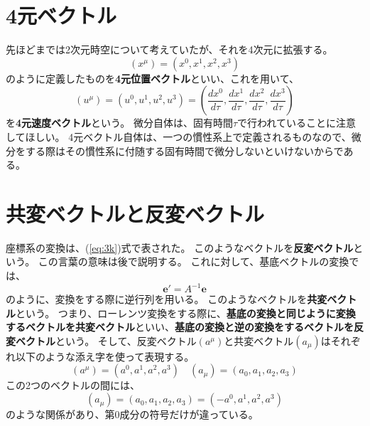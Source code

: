 \documentclass[a4paper]{jsreport}
\begin{document}
        \section{4元ベクトル}
            先ほどまでは2次元時空について考えていたが、それを4次元に拡張する。
            \begin{equation}
                (x^\mu) = (x^0, x^1, x^2, x^3)
            \end{equation}
            のように定義したものを\textbf{4元位置ベクトル}といい、これを用いて、
            \begin{equation}
                (u^\mu) = (u^0, u^1, u^2, u^3) = \left( \frac{dx^0}{d\tau}, \frac{dx^1}{d\tau}, \frac{dx^2}{d\tau}, \frac{dx^3}{d\tau} \right)
            \end{equation}
            を\textbf{4元速度ベクトル}という。
            微分自体は、固有時間$\tau$で行われていることに注意してほしい。
            4元ベクトル自体は、一つの慣性系上で定義されるものなので、微分をする際はその慣性系に付随する固有時間で微分しないといけないからである。

        \section{共変ベクトルと反変ベクトル}
            座標系の変換は、(\ref{eq:3k})式で表された。
            このようなベクトルを\textbf{反変ベクトル}という。
            この言葉の意味は後で説明する。
            これに対して、基底ベクトルの変換では、
            \begin{equation}
                \mathbf{e'} = A^{-1} \mathbf{e}
            \end{equation}
            のように、変換をする際に逆行列を用いる。
            このようなベクトルを\textbf{共変ベクトル}という。
            つまり、ローレンツ変換をする際に、\textbf{基底の変換と同じように変換するベクトルを共変ベクトル}といい、\textbf{基底の変換と逆の変換をするベクトルを反変ベクトル}という。
            そして、反変ベクトル$(a^{\mu})$と共変ベクトル$(a_\mu)$はそれぞれ以下のような添え字を使って表現する。
            \begin{equation}
                (a^{\mu}) = (a^0, a^1, a^2, a^3) \quad (a_{\mu}) = (a_0, a_1, a_2, a_3)
            \end{equation}
            この2つのベクトルの間には、
            \begin{equation}
                (a_{\mu}) =  (a_0, a_1, a_2, a_3) = (-a^0, a^1, a^2, a^3) 
            \end{equation}
            のような関係があり、第0成分の符号だけが違っている。
\end{document}

